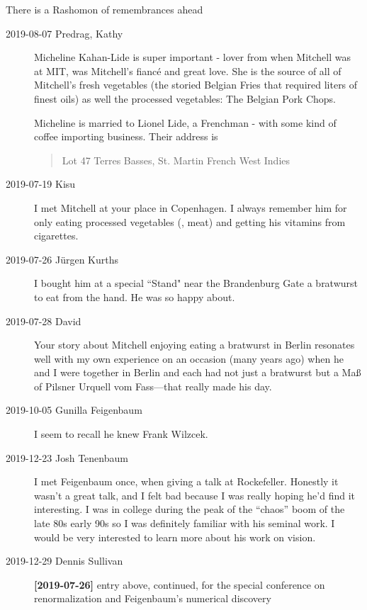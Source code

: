 There is a Rashomon of remembrances ahead

\begin{description}

\item[2019-08-07 Predrag, Kathy]
Micheline Kahan-Lide is super important - lover from when Mitchell was at
MIT, was Mitchell's fianc\'e and great love. She is the source of all of
Mitchell's fresh vegetables (the storied Belgian Fries that required
liters of finest oils) as well the processed vegetables: The Belgian Pork
Chops.

Micheline is married to Lionel Lide, a Frenchman - with some kind of
coffee importing business. Their address is
\begin{quote}
Lot 47
Terres Basses,
St. Martin
French West Indies
\end{quote}

\item[2019-07-19 Kisu] I met Mitchell at your place in Copenhagen. I
always remember him for only eating processed vegetables (\ie, meat) and
getting his vitamins from cigarettes.

\item[2019-07-26 Jürgen Kurths] %
 I bought him at a special ``Stand" near the Brandenburg Gate a
bratwurst to eat from the hand. He was so happy about.

\item[2019-07-28 David]
Your story about Mitchell enjoying eating a bratwurst in Berlin
resonates well with my own experience on an occasion (many years ago)
when he and I were together in Berlin and each had not just a bratwurst
but  a Maß of Pilsner Urquell vom Fass—that really made his day.

\item[2019-10-05 Gunilla Feigenbaum] %
I seem to recall he knew Frank Wilzcek.

\item[2019-12-23 Josh Tenenbaum] %
I met Feigenbaum once, when giving a talk at Rockefeller.  Honestly it
wasn't a great talk, and I felt bad because I was really hoping he'd find
it interesting. I was in college during the peak of the ``chaos'' boom of
the late 80s early 90s so I was definitely familiar with his seminal
work.  I would be very interested to learn more about his work on vision.

\item[2019-12-29 Dennis Sullivan]
{\bf [2019-07-26]} entry above, continued,
for the special conference on renormalization and Feigenbaum's numerical discovery


\end{description}
